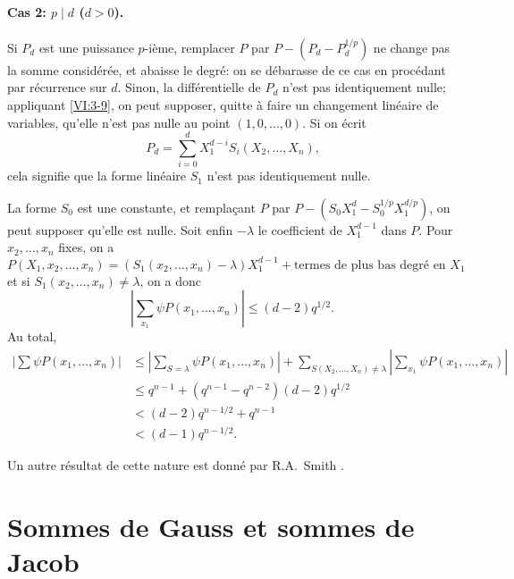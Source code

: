 \paragraph{Cas 2: $p\mid d$ ($d>0$).}
Si $P_d$ est une puissance $p$-i\`eme, remplacer $P$ par $P-(P_d-P_d^{1/p})$ ne 
change pas la somme consid\'er\'ee, et abaisse le degr\'e: on se d\'ebarasse de 
ce cas en proc\'edant par r\'ecurrence sur $d$. Sinon, la diff\'erentielle de 
$P_d$ n'est pas identiquement nulle; appliquant \ref{VI:3-9}, on peut supposer, 
quitte \`a faire un changement lin\'eaire de variables, qu'elle n'est pas nulle 
au point $(1,0,\dots,0)$. Si on \'ecrit 
\[
  P_d = \sum_{i=0}^d X_1^{d-i} S_i(X_2,\dots,X_n) \text{,} 
\]
cela signifie que la forme lin\'eaire $S_1$ n'est pas identiquement nulle. 

La forme $S_0$ est une constante, et remplaçant $P$ par 
$P-(S_0 X_1^d -S_0^{1/p} X_1^{d/p})$, on peut supposer qu'elle est nulle. Soit 
enfin $-\lambda$ le coefficient de $X_1^{d-1}$ dans $P$. Pour $x_2,\dots,x_n$ 
fixes, on a 
\[
  P(X_1,x_2,\dots,x_n) = (S_1(x_2,\dots,x_n)-\lambda) X_1^{d-1} + \text{termes de plus bas degr\'e en $X_1$} 
\]
et si $S_1(x_2,\dots,x_n)\ne \lambda$, on a donc 
\[
  \left| \sum_{x_1} \psi P(x_1,\dots,x_n)\right| \leqslant (d-2) q^{1/2} \text{.} 
\]
Au total, 
\begin{align*}
  \left|\sum \psi P(x_1,\dots,x_n)\right| 
    &\leqslant \left|\sum_{S=\lambda} \psi P(x_1,\dots,x_n)\right| + \sum_{S(X_2,\dots,X_n)\ne\lambda} \left| \sum_{x_1} \psi P(x_1,\dots,x_n)\right| \\
    &\leqslant q^{n-1} + (q^{n-1}-q^{n-2})(d-2) q^{1/2} \\
    &< (d-2) q^{n-1/2} + q^{n-1} \\
    &< (d-1) q^{n-1/2} \text{.}
\end{align*}

Un autre r\'esultat de cette nature est donn\'e par R.A.\ Smith 
\cite{sm70}. 










\section{Sommes de Gauss et sommes de Jacob}\label{VI:4}





\subsection{}\label{VI:4-1}

